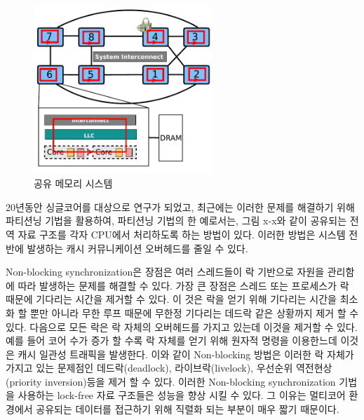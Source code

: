 \begin{figure}[h]
    \centering
    \includegraphics[width=0.6\textwidth]{fig/archcache_percore}
    \caption{공유 메모리 시스템}
  \label{shared_memory}
\end{figure}

20년동안 싱글코어를 대상으로 연구가 되었고, 최근에는 이러한 문제를 해결하기 위해 
파티션닝 기법을 활용하여, 파티션닝 기법의 한 예로서는, 그림 x-x와 같이 공유되는 
전역 자료 구조를 각자 CPU에서 처리하도록 하는 방법이 있다.  
이러한 방법은 시스템 전반에 발생하는 캐시 커뮤니케이션 오버헤드를 줄일 수 있다. 



Non-blocking synchronization은 장점은 여러 스레드들이 락 기반으로 자원을 관리함에 따라
 발생하는 문제를 해결할 수 있다. 
가장 큰 장점은 스레드 또는 프로세스가 락 때문에 기다리는 시간을 제거할 수 있다.
이 것은 락을 얻기 위해 기다리는 시간을 최소화 할 뿐만 아니라 무한 루프 때문에 무한정 기다리는 
데드락 같은 상황까지 제거 할 수 있다. 
다음으로 모든 락은 락 자체의 오버헤드를 가지고 있는데 이것을 제거할 수 있다. 
예를 들어 코어 수가 증가 할 수록 락 자체를 얻기 위해 원자적 명령을 이용한느데 이것은 캐시 일관성 트래픽을 
발생한다. 
이와 같이 Non-blocking 방법은 이러한 락 자체가 가지고 있는 문제점인 데드락(deadlock), 라이브락(livelock), 
우선순위 역전현상(priority inversion)등을 제거 할 수 있다. 
이러한 Non-blocking synchronization 기법을 사용하는 lock-free 자료 구조들은 성능을 향상 시킬 수 있다. 
그 이유는 멀티코어 환경에서 공유되는 데이터를 접근하기 위해 직렬화 되는 부분이 매우 짧기 때문이다. 





%



